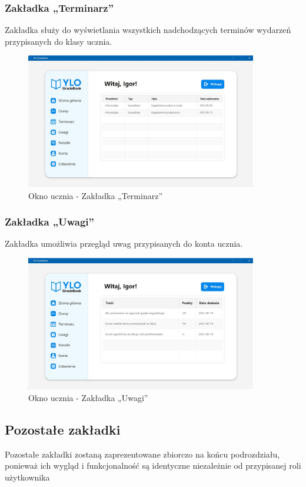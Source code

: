 \subsubsection{Zakładka „Terminarz”}
Zakładka służy do wyświetlania wszystkich nadchodzących terminów wydarzeń przypisanych do klasy ucznia.
\begin{figure}[H]
    \centering
    \includegraphics[width=0.9\textwidth]{figures/StudentWindow/fig_0010.eps}
    \caption{Okno ucznia - Zakładka „Terminarz”}
    \label{fig:studentDaedLinePane}
\end{figure}
\newpage
\subsubsection{Zakładka „Uwagi”}
Zakładka umożliwia przegląd uwag przypisanych do konta ucznia.
\begin{figure}[H]
    \centering
    \includegraphics[width=0.9\textwidth]{figures/StudentWindow/fig_0011.eps}
    \caption{Okno ucznia - Zakładka „Uwagi”}
    \label{fig:studentNegativeNotesPane}
\end{figure}

\subsection*{Pozostałe zakładki}
Pozostałe zakładki zostaną zaprezentowane zbiorczo na końcu podrozdziału, ponieważ ich wygląd i funkcjonalność są identyczne niezależnie od przypisanej roli użytkownika
\newpage
